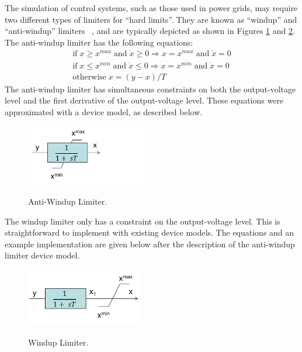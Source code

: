

 
The simulation of control systems, such as those used in power grids,
may require two different types of limiters for ``hard limits''.  They
are known as ``windup'' and ``anti-windup'' limiters ~\cite{Milano},
and are typically depicted as shown in Figures \ref{figAntiWindupLimiter} 
and \ref{figWindupLimiter}. The anti-windup limiter has the following 
equations:
\[
  \begin{array}{ll} 
  \mbox{if} \; x \geq x^{max} \; \mbox{and} \; \dot{x} \geq 0 \Rightarrow x = x^{max} \; \mbox{and} \; \dot{x} = 0\\
  \mbox{if} \; x \leq x^{min} \; \mbox{and} \; \dot{x} \leq 0 \Rightarrow x = x^{min} \; \mbox{and} \; \dot{x} = 0\\
  \mbox{otherwise} \; x = (y-x)/T
  \end{array}
\]
The anti-windup limiter has simultaneous constraints on both the output-voltage
level and the first derivative of the output-voltage level.  These equations were 
approximated with a \Xyce{} device model, as described below.  

\begin{figure}[ht]
  \centering
  \scalebox{1.0}
  {\includegraphics[width=2.1in,height= 1.05in]{AntiWindupLimiter.jpg}}
  \caption[Anti-Windup Limiter]{Anti-Windup Limiter. \label{figAntiWindupLimiter}}
\end{figure}

The windup limiter only has a constraint on the output-voltage level.  This is 
straightforward to implement with existing \Xyce{} device models.  The equations
and an example implementation are given below after the description of the \Xyce{} 
anti-windup limiter device model.

\begin{figure}[ht]
  \centering
  \scalebox{1.0}
  {\includegraphics[width=2.0in,height= 1.0in]{WindupLimiter.jpg}}
  \caption[Windup Limiter]{Windup Limiter. \label{figWindupLimiter}}
\end{figure}

